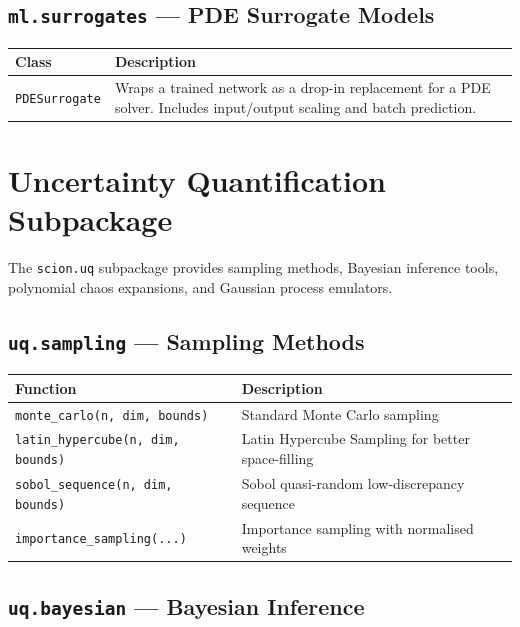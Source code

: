 \documentclass[11pt,a4paper]{report}
\begin{document}
\section{\texttt{ml.surrogates} --- PDE Surrogate Models}

\begin{longtable}{lp{8cm}}
\toprule
\textbf{Class} & \textbf{Description} \\
\midrule
\texttt{PDESurrogate} & Wraps a trained network as a drop-in replacement for a PDE solver. Includes input/output scaling and batch prediction. \\
\bottomrule
\end{longtable}

\chapter{Uncertainty Quantification Subpackage}

The \texttt{scion.uq} subpackage provides sampling methods, Bayesian inference tools, polynomial chaos expansions, and Gaussian process emulators.

\section{\texttt{uq.sampling} --- Sampling Methods}

\begin{longtable}{lp{8cm}}
\toprule
\textbf{Function} & \textbf{Description} \\
\midrule
\texttt{monte\_carlo(n, dim, bounds)} & Standard Monte Carlo sampling \\
\texttt{latin\_hypercube(n, dim, bounds)} & Latin Hypercube Sampling for better space-filling \\
\texttt{sobol\_sequence(n, dim, bounds)} & Sobol quasi-random low-discrepancy sequence \\
\texttt{importance\_sampling(...)} & Importance sampling with normalised weights \\
\bottomrule
\end{longtable}

\section{\texttt{uq.bayesian} --- Bayesian Inference}
\end{document}
